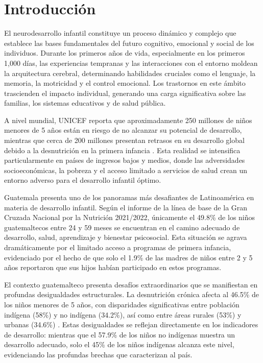 \chapter{Introducción}
El neurodesarrollo infantil constituye un proceso dinámico y complejo que 
establece las bases fundamentales del futuro cognitivo, emocional y social de 
los individuos. Durante los primeros años de vida, especialmente en los primeros
1,000 días, las experiencias tempranas y las interacciones con el entorno
moldean la arquitectura cerebral, determinando habilidades cruciales como el
lenguaje, la memoria, la motricidad y el control emocional. Los trastornos en
este ámbito trascienden el impacto individual, generando una carga significativa
sobre las familias, los sistemas educativos y de salud pública.

A nivel mundial, UNICEF reporta que aproximadamente 250 millones de niños
menores de 5 años están en riesgo de no alcanzar su potencial de desarrollo,
mientras  que cerca de 200 millones presentan retrasos en su desarrollo global
debido a  la desnutrición en la primera infancia \cite{UNICEF2023}. Esta
realidad se  intensifica particularmente en países de ingresos bajos y medios,
donde las  adversidades socioeconómicas, la pobreza y el acceso limitado a
servicios de  salud crean un entorno adverso para el desarrollo infantil óptimo.

Guatemala presenta uno de los panoramas más desafiantes de Latinoamérica en
materia de desarrollo infantil. Según el informe de la línea de base de la Gran
Cruzada Nacional por la Nutrición 2021/2022, únicamente el 49.8\% de los niños
guatemaltecos entre 24 y 59 meses se encuentran en el camino adecuado de
desarrollo, salud, aprendizaje y bienestar psicosocial. Esta situación se agrava
dramáticamente por el limitado acceso a programas de primera infancia,
evidenciado por el hecho de que solo el 1.9\% de las madres de niños entre 2 y 5
años reportaron que sus hijos habían participado en estos programas.

El contexto guatemalteco presenta desafíos extraordinarios que se manifiestan en
profundas desigualdades estructurales. La desnutrición crónica afecta al 46.5\%
de los niños menores de 5 años, con disparidades significativas entre población
indígena (58\%) y no indígena (34.2\%), así como entre áreas rurales (53\%) y
urbanas (34.6\%) \cite{EnMaternoInfantil}. Estas desigualdades se reflejan
directamente en los indicadores de desarrollo: mientras que el 57.9\% de los
niños no indígenas muestra un desarrollo adecuado, solo el 45\% de los niños
indígenas alcanza este nivel, evidenciando las profundas brechas que
caracterizan al país.

